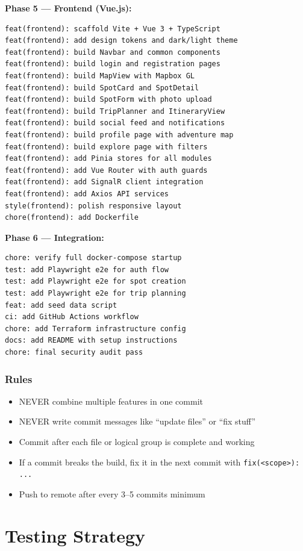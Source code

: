 \documentclass[12pt,letterpaper]{article}
\begin{document}
\textbf{Phase 5 --- Frontend (Vue.js):}
\begin{lstlisting}[style=code]
feat(frontend): scaffold Vite + Vue 3 + TypeScript
feat(frontend): add design tokens and dark/light theme
feat(frontend): build Navbar and common components
feat(frontend): build login and registration pages
feat(frontend): build MapView with Mapbox GL
feat(frontend): build SpotCard and SpotDetail
feat(frontend): build SpotForm with photo upload
feat(frontend): build TripPlanner and ItineraryView
feat(frontend): build social feed and notifications
feat(frontend): build profile page with adventure map
feat(frontend): build explore page with filters
feat(frontend): add Pinia stores for all modules
feat(frontend): add Vue Router with auth guards
feat(frontend): add SignalR client integration
feat(frontend): add Axios API services
style(frontend): polish responsive layout
chore(frontend): add Dockerfile
\end{lstlisting}

\textbf{Phase 6 --- Integration:}
\begin{lstlisting}[style=code]
chore: verify full docker-compose startup
test: add Playwright e2e for auth flow
test: add Playwright e2e for spot creation
test: add Playwright e2e for trip planning
feat: add seed data script
ci: add GitHub Actions workflow
chore: add Terraform infrastructure config
docs: add README with setup instructions
chore: final security audit pass
\end{lstlisting}

\subsubsection{Rules}
\begin{itemize}
  \item NEVER combine multiple features in one commit
  \item NEVER write commit messages like ``update files'' or ``fix stuff''
  \item Commit after each file or logical group is complete and working
  \item If a commit breaks the build, fix it in the next commit with \texttt{fix(<scope>): ...}
  \item Push to remote after every 3--5 commits minimum
\end{itemize}

\newpage

\section{Testing Strategy}
\end{document}

